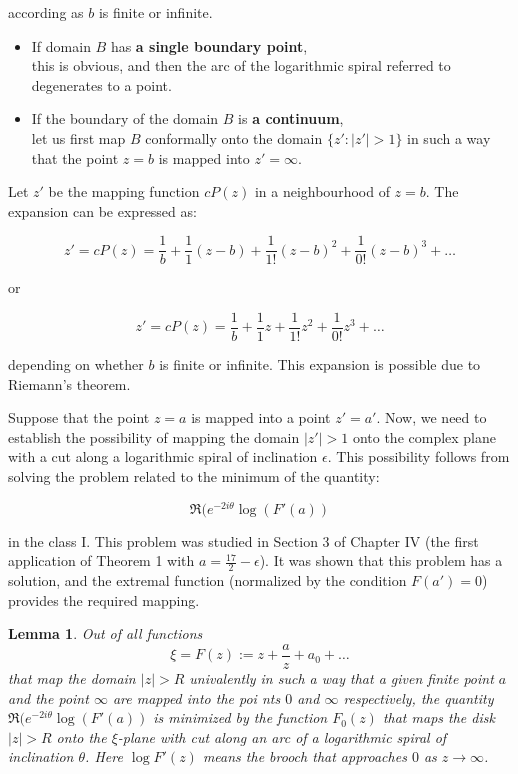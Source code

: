 \documentclass[
]{book}
\newtheorem{lemma}{Lemma}[chapter]
\theoremstyle{definition}
\theoremstyle{definition}
\theoremstyle{definition}
\theoremstyle{definition}
\theoremstyle{remark}
\begin{document}
according as \(b\) is finite or infinite.

\begin{itemize}
\item
  If domain \(B\) has \textbf{a single boundary point},\\
  this is obvious, and then the arc of the logarithmic spiral referred to degenerates to a point.
\item
  If the boundary of the domain \(B\) is \textbf{a continuum},\\
  let us first map \(B\) conformally onto the domain \(\{z' : |z'| > 1\}\) in such a way that the point \(z = b\) is mapped into \(z' = \infty\).
\end{itemize}

Let \(z'\) be the mapping function \(cP(z)\) in a neighbourhood of \(z = b\). The expansion can be expressed as:

\[
z' = cP(z) = \frac{1}{b} + \frac{1}{1} (z - b) + \frac{1}{1!} (z - b)^2 + \frac{1}{0!} (z - b)^3 + \ldots
\]

or

\[
z' = cP(z) = \frac{1}{b} + \frac{1}{1}z + \frac{1}{1!}z^2 + \frac{1}{0!}z^3 + \ldots
\]

depending on whether \(b\) is finite or infinite. This expansion is possible due to Riemann's theorem.

Suppose that the point \(z = a\) is mapped into a point \(z' = a'\). Now, we need to establish the possibility of mapping the domain \(\lvert z' \rvert > 1\) onto the complex plane with a cut along a logarithmic spiral of inclination \(\epsilon\). This possibility follows from solving the problem related to the minimum of the quantity:

\[
 \Re(e^{-2i\theta} \log (F'(a))
\]

in the class I. This problem was studied in Section 3 of Chapter IV (the first application of Theorem 1 with \(a = \frac{17}{2} - \epsilon\)). It was shown that this problem has a solution, and the extremal function (normalized by the condition \(F(a') = 0\)) provides the required mapping.

\begin{lemma}
\protect\hypertarget{lem:unnamed-chunk-72}{}\label{lem:unnamed-chunk-72}Out of all functions
\[
\xi=F(z) := z + \frac{a}{z} + a_0 + \ldots
\]
that map the domain \(|z| > R\) univalently in such a way that a given finite point \(a\) and the point \(\infty\) are
mapped into the poi nts \(0\) and \(\infty\) respectively, the quantity \(\Re(e^{-2i\theta} \log (F'(a))\)
is minimized by the function \(F_0(z)\) that maps the disk \(|z| > R\) onto the \(\xi\)-plane with cut along an arc of a logarithmic spiral of inclination \(\theta\). Here \(\log F '(z)\) means the brooch that approaches \(0\) as \(z \to \infty\).
\end{lemma}
\end{document}
